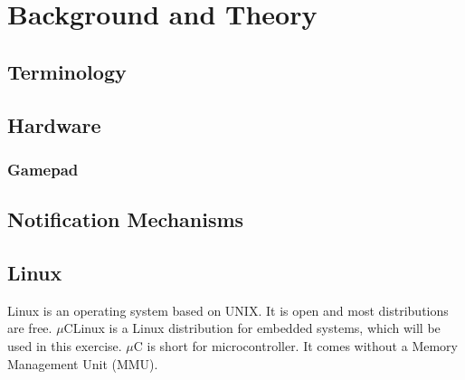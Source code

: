 \chapter{Background and Theory}

\section{Terminology}


\section{Hardware}


\subsection{Gamepad}\label{sec:gamepad}



\section{Notification Mechanisms}




\section{Linux}
Linux is an operating system based on UNIX. It is open and most distributions are free. $\mu$CLinux is a Linux distribution for embedded systems, which will be used in this exercise. $\mu$C is short for microcontroller. It comes without a Memory Management Unit (MMU).
